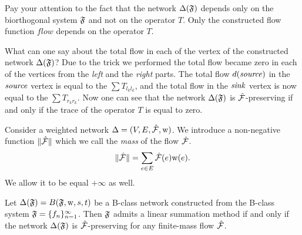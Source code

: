 \documentclass[12pt]{article}
\begin{document}
    \begin{remark}
      Pay your attention to the fact that the network $\Delta(\mathfrak{F})$
      depends only on the biorthogonal system $\mathfrak{F}$ and not on the operator $T$.
      Only the constructed flow function $flow$ depends on the operator $T$.
    \end{remark}
    What can one say about the total flow in each of the vertex of the constructed network $\Delta(\mathfrak{F})$?
    Due to the trick we performed the total flow became zero in each of the vertices from the \emph{left} and the \emph{right} parts.
    The total flow $d(\mathit{source})$ in the $\mathit{source}$ vertex is equal to the $\sum T_{l_k l_k}$, and the total flow in the
    $\mathit{sink}$ vertex is now equal to the $\sum T_{r_k r_k}$.
    Now one can see that the network $\Delta(\mathfrak{F})$ is $\mathcal{\hat{F}}$-preserving if and only if the trace of the operator $T$ is equal to
    zero.
    \begin{definition}
      Consider a weighted network $\Delta = (V, E, \mathcal{\hat{F}}, \mathrm{w})$.
      We introduce a non-negative function $\|\mathcal{\hat{F}}\|$ which we call the \emph{mass} of the flow $\mathcal{\hat{F}}$.
      $$
        \|\mathcal{\hat{F}}\| = \sum_{e \in E} \mathcal{\hat{F}}(e) \mathrm{w}(e).
      $$
      We allow it to be equal $+\infty$ as well.
    \end{definition}
    \begin{theorem}
      \label{thm-graph-eq}
        Let $\Delta(\mathfrak{F}) = B(\mathfrak{F}, \mathrm{w}, s, t)$ be a B-class network constructed
          from the B-class system $\mathfrak{F} = \{{f}_n\}_{n=1}^\infty$.
        Then $\mathfrak{F}$ admits a linear summation method if and only if
          the network $\Delta(\mathfrak{F})$ is $\mathcal{\hat{F}}$-preserving for any
          finite-mass flow $\mathcal{\hat{F}}$.
    \end{theorem}
\end{document}

